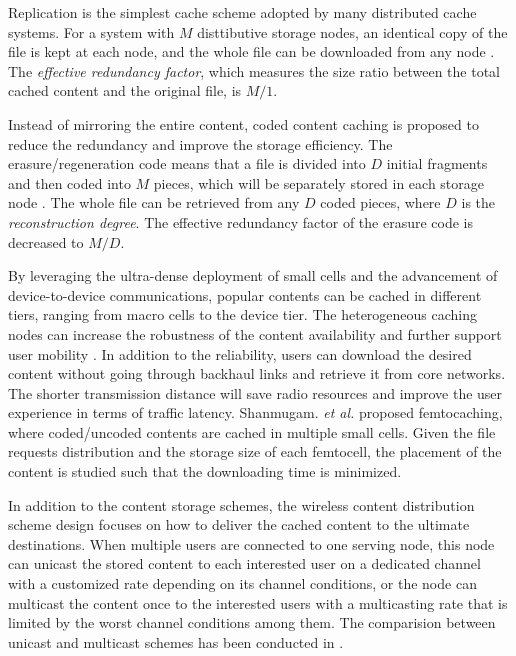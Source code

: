 \documentclass[journal,12pt,onecolumn]{IEEEtran}
\begin{document}
Replication is the simplest cache scheme adopted by many distributed cache systems. For a system with $M$ disttibutive storage nodes, an identical copy of the file is kept at each node, and the whole file can be downloaded from any node \cite{Rodrigues:2005:HAD:2138958.2138987}. The \emph{effective redundancy factor}, which measures the size ratio between the total cached content and the original file, is $M/1$. 

Instead of mirroring the entire content, coded content caching is proposed to reduce the redundancy and improve the storage efficiency. The erasure/regeneration code means that a file is divided into $D$ initial fragments and then coded into $M$ pieces, which will be separately stored in each storage node \cite{5550492,6158613}. The whole file can be retrieved from any $D$ coded pieces, where $D$ is the \emph{reconstruction degree}. The effective redundancy factor of the erasure code is decreased to $M/D$. 





By leveraging the ultra-dense deployment of small cells and the advancement of device-to-device communications, popular contents can be cached in different tiers, ranging from macro cells to the device tier. The heterogeneous caching nodes can increase the robustness of the content availability and further support user mobility \cite{Vasilakos:2012:PSN:2342488.2342502}. In addition to the reliability, users can download the desired content without going through backhaul links and retrieve it from core networks. The shorter transmission distance will save radio resources and improve the user experience in terms of traffic latency. Shanmugam. \emph{et al.} \cite{6600983} proposed femtocaching, where coded/uncoded contents are cached in multiple small cells. Given the file requests distribution and the storage size of each femtocell, the placement of the content is studied such that the downloading time is minimized.

In addition to the content storage schemes, the wireless content distribution scheme design focuses on how to deliver the cached content to the ultimate destinations. When multiple users are connected to one serving node, this node can unicast the stored content to each interested user on a dedicated channel with a customized rate depending on its channel conditions, or the node can multicast the content once to the interested users with a multicasting rate that is limited by the worst channel conditions among them. The comparision between unicast and multicast schemes has been conducted in \cite{6516553}.
\end{document}
